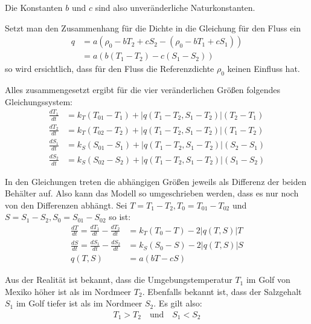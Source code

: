 \documentclass[a4paper,twoside]{article}
\begin{document}
	Die Konstanten \(b\) und \(c\) sind also unveränderliche Naturkonstanten.
	
	Setzt man den Zusammenhang für die Dichte in die Gleichung für den Fluss ein
	\begin{align*}
		q &= a \left( \rho_0 - bT_2 + cS_2 - \left( \rho_0 - bT_1 + cS_1 \right) \right) \\
		&= a \left( b\left( T_1 - T_2 \right) - c \left( S_1 - S_2 \right) \right)
	\end{align*}
	so wird ersichtlich, dass für den Fluss die Referenzdichte \(\rho_0\) keinen Einfluss hat.
	
	Alles zusammengesetzt ergibt für die vier veränderlichen Größen folgendes Gleichungssystem:
	\begin{align*}
		\frac{dT_1}{dt} &= k_T\left(T_{01} - T_1\right) + \left|q(T_1 - T_2,S_1 - T_2)\right|\left(T_2 - T_1\right) \\
		\frac{dT_2}{dt} &= k_T\left(T_{02} - T_2\right) + \left|q(T_1 - T_2,S_1 - T_2)\right|\left(T_1 - T_2\right) \\
		\frac{dS_1}{dt} &= k_S\left(S_{01} - S_1\right) + \left|q(T_1 - T_2,S_1 - T_2)\right|\left(S_2 - S_1\right) \\
		\frac{dS_2}{dt} &= k_S\left(S_{02} - S_2\right) + \left|q(T_1 - T_2,S_1 - T_2)\right|\left(S_1 - S_2\right)
	\end{align*}
	 
	 In den Gleichungen treten die abhängigen Größen jeweils als Differenz der beiden Behälter auf. Also kann das Modell so umgeschrieben werden, dass es nur noch von den Differenzen abhängt. Sei \(T = T_1 - T_2, T_0 = T_{01} - T_{02}\) und \(S = S_1 - S_2, S_0 = S_{01} - S_{02}\)  so ist:
	 \begin{align*}
	 	\frac{dT}{dt} = \frac{dT_1}{dt} - \frac{dT_2}{dt} &= k_T\left(T_{0} - T\right) - 2\left|q(T,S)\right|T \\
	 	\frac{dS}{dt} = \frac{dS_1}{dt} - \frac{dS_2}{dt} &= k_S\left(S_{0} - S\right) - 2\left|q(T,S)\right|S \\
	 	q(T,S) &= a\left(bT - cS\right)
	 \end{align*}
	  
	Aus der Realität \cite{Skript} ist bekannt, dass die Umgebungstemperatur \(T_1\) im Golf von Mexiko höher ist als im Nordmeer \(T_2\). Ebenfalls bekannt ist, dass der Salzgehalt \(S_1\) im Golf tiefer ist als im Nordmeer \(S_2\). Es gilt also:
	\begin{align*}
		T_1 > T_2 \quad \textrm{und} \quad S_1 < S_2
	\end{align*}
	
\end{document}
